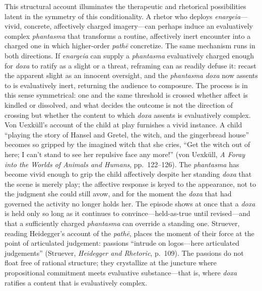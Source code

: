\documentclass{article}
\begin{document}
This structural account illuminates the therapeutic and rhetorical possibilities latent in the symmetry of this conditionality. A rhetor who deploys \textit{enargeia}---vivid, concrete, affectively charged imagery---can perhaps induce an evaluatively complex \textit{phantasma} that transforms a routine, affectively inert encounter into a charged one in which higher-order \textit{pathē} concretize. The same mechanism runs in both directions. If \textit{enargeia} can supply a \textit{phantasma} evaluatively charged enough for \textit{doxa} to ratify as a slight or a threat, reframing can as readily defuse it: recast the apparent slight as an innocent oversight, and the \textit{phantasma} \textit{doxa} now assents to is evaluatively inert, returning the audience to composure. The process is in this sense symmetrical: one and the same threshold is crossed whether affect is kindled or dissolved, and what decides the outcome is not the direction of crossing but whether the content to which \textit{doxa} assents is evaluatively complex. Von Uexküll's account of the child at play furnishes a vivid instance. A child ``playing the story of Hansel and Gretel, the witch, and the gingerbread house'' becomes so gripped by the imagined witch that she cries, ``Get the witch out of here; I can't stand to see her repulsive face any more!'' (von Uexküll, \textit{A Foray into the Worlds of Animals and Humans}, pp.~122--126). The \textit{phantasma} has become vivid enough to grip the child affectively despite her standing \textit{doxa} that the scene is merely play; the affective response is keyed to the appearance, not to the judgment she could still avow, and for the moment the \textit{doxa} that had governed the activity no longer holds her. The episode shows at once that a \textit{doxa} is held only so long as it continues to convince---held-as-true until revised---and that a sufficiently charged \textit{phantasma} can override a standing one. Struever, reading Heidegger's account of the \textit{pathē}, places the moment of their force at the point of articulated judgement: passions ``intrude on logos---here articulated judgements'' (Struever, \textit{Heidegger and Rhetoric}, p.~109). The passions do not float free of rational structure; they crystallize at the juncture where propositional commitment meets evaluative substance---that is, where \textit{doxa} ratifies a content that is evaluatively complex.
\end{document}
